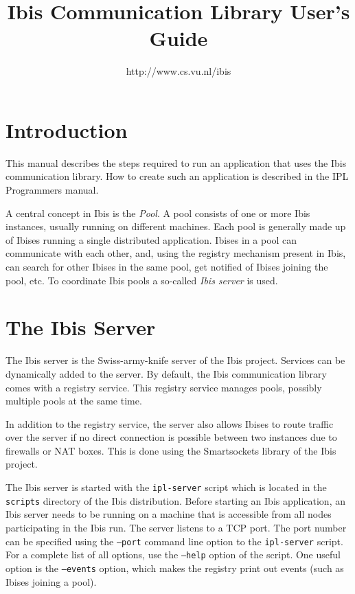 \documentclass[a4paper,10pt]{article}
\begin{document}
\title{Ibis Communication Library User's Guide}

\author{http://www.cs.vu.nl/ibis}

\maketitle

\section{Introduction}

This manual describes the steps required to run an application that 
uses the Ibis communication library. How to create such an application
is described in the IPL Programmers manual.

A central concept in Ibis is the \emph{Pool}. A pool consists of one or
more Ibis instances, usually running on different machines. Each pool is
generally made up of Ibises running a single distributed application.
Ibises in a pool can communicate with each other, and, using the
registry mechanism present in Ibis, can search for other Ibises in the
same pool, get notified of Ibises joining the pool, etc. To
coordinate Ibis pools a so-called \emph{Ibis server} is used.

\section{The Ibis Server}

The Ibis server is the Swiss-army-knife server of the Ibis project.
Services can be dynamically added to the server. By default, the Ibis
communication library comes with a registry service. This registry
service manages pools, possibly multiple pools at the same time.  

In addition to the registry service, the server also allows
Ibises to route traffic over the server if no direct connection is
possible between two instances due to firewalls or NAT boxes. This is
done using the Smartsockets library of the Ibis project.

The Ibis server is started with the \texttt{ipl-server} script which is
located in the \texttt{scripts} directory of the Ibis distribution.  Before
starting an Ibis application, an Ibis server needs to be running on a
machine that is accessible from all nodes participating in the Ibis run.
The server listens to a TCP port. The port number can be specified using
the \texttt{--port} command line option to the \texttt{ipl-server}
script.  For a complete list of all options, use the \texttt{--help}
option of the script. One useful option is the  \texttt{--events}
option, which makes the registry print out events (such as Ibises
joining a pool).
\end{document}
